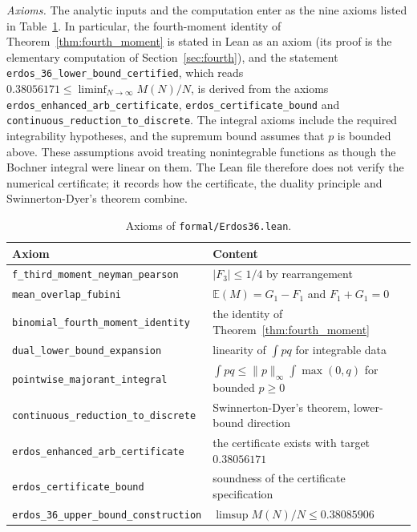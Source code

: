 \documentclass[11pt,a4paper]{article}
\theoremstyle{definition}
\theoremstyle{remark}
\newcommand{\E}{\mathbb{E}}
\begin{document}
\emph{Axioms.} The analytic inputs and the computation enter as the nine axioms listed in Table~\ref{tab:axioms}. In particular, the fourth-moment identity of Theorem~\ref{thm:fourth_moment} is stated in Lean as an axiom (its proof is the elementary computation of Section~\ref{sec:fourth}), and the statement \nolinkurl{erdos_36_lower_bound_certified}, which reads $0.38056171 \le \liminf_{N \to \infty} M(N)/N$, is derived from the axioms \nolinkurl{erdos_enhanced_arb_certificate}, \nolinkurl{erdos_certificate_bound} and \nolinkurl{continuous_reduction_to_discrete}. The integral axioms include the required integrability hypotheses, and the supremum bound assumes that $p$ is bounded above. These assumptions avoid treating nonintegrable functions as though the Bochner integral were linear on them. The Lean file therefore does not verify the numerical certificate; it records how the certificate, the duality principle and Swinnerton-Dyer's theorem combine.

\begin{table}[h]
\centering
\small
\begin{tabular}{ll}
\toprule
\textbf{Axiom} & \textbf{Content} \\
\midrule
\texttt{f\_third\_moment\_neyman\_pearson} & $|F_3| \le 1/4$ by rearrangement \\
\texttt{mean\_overlap\_fubini} & $\E(M) = G_1 - F_1$ and $F_1 + G_1 = 0$ \\
\texttt{binomial\_fourth\_moment\_identity} & the identity of Theorem~\ref{thm:fourth_moment} \\
\texttt{dual\_lower\_bound\_expansion} & linearity of $\int pq$ for integrable data \\
\texttt{pointwise\_majorant\_integral} & $\int pq \le \|p\|_\infty \int \max(0, q)$ for bounded $p \ge 0$ \\
\texttt{continuous\_reduction\_to\_discrete} & Swinnerton-Dyer's theorem, lower-bound direction \\
\texttt{erdos\_enhanced\_arb\_certificate} & the certificate exists with target $0.38056171$ \\
\texttt{erdos\_certificate\_bound} & soundness of the certificate specification \\
\texttt{erdos\_36\_upper\_bound\_construction} & $\limsup M(N)/N \le 0.38085906$ \\
\bottomrule
\end{tabular}
\caption{Axioms of \nolinkurl{formal/Erdos36.lean}.}
\label{tab:axioms}
\end{table}
\end{document}

